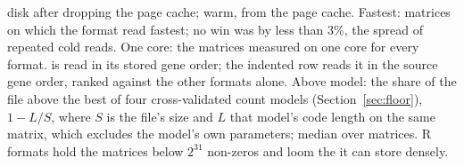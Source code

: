 \begin{table}[tbp]
\begin{minipage}{\linewidth}
disk after dropping the page cache; warm, from the page cache. Fastest: matrices on which the format read fastest; no
\sone{} win was by less than 3\%, the spread of repeated cold reads. One core: the  matrices measured
on one core for every format. \sone{} is read in its stored gene order; the indented row reads it in the source gene
order, ranked against the other formats alone. Above model: the share of the file above the best of four
cross-validated count models (Section~\ref{sec:floor}), $1-L/S$, where $S$ is the file's size and $L$ that model's code
length on the same matrix, which excludes the model's own parameters; median over matrices. R formats hold the
 matrices below $2^{31}$ non-zeros and loom the  it can store densely.
\end{minipage}
\end{table}
